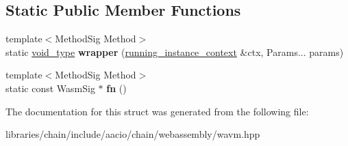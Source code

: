\subsection*{Static Public Member Functions}
\begin{DoxyCompactItemize}
\item 
\mbox{\label{structaacio_1_1chain_1_1webassembly_1_1wavm_1_1intrinsic__function__invoker_3_01_wasm_sig_00_01vd3c3b831951ee6790b5589afecfb1c9b_a9742a3808c3fdbf7fec7b034144cf26e}} 
{\footnotesize template$<$Method\+Sig Method$>$ }\\static \mbox{\hyperlink{structaacio_1_1chain_1_1webassembly_1_1wavm_1_1void__type}{void\+\_\+type}} {\bfseries wrapper} (\mbox{\hyperlink{structaacio_1_1chain_1_1webassembly_1_1wavm_1_1running__instance__context}{running\+\_\+instance\+\_\+context}} \&ctx, Params... params)
\item 
\mbox{\label{structaacio_1_1chain_1_1webassembly_1_1wavm_1_1intrinsic__function__invoker_3_01_wasm_sig_00_01vd3c3b831951ee6790b5589afecfb1c9b_a64a1cb1811632649d85bcbe386a4b80f}} 
{\footnotesize template$<$Method\+Sig Method$>$ }\\static const Wasm\+Sig $\ast$ {\bfseries fn} ()
\end{DoxyCompactItemize}


The documentation for this struct was generated from the following file\+:\begin{DoxyCompactItemize}
\item 
libraries/chain/include/aacio/chain/webassembly/wavm.\+hpp\end{DoxyCompactItemize}
